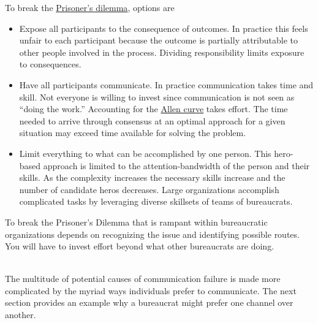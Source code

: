 To break the 
\href{https://en.wikipedia.org/wiki/Prisoner\%27s\_dilemma}{Prisoner's dilemma}, 
options are 
\begin{itemize}
    \item Expose all participants to the consequence of outcomes. In practice this feels unfair to each participant because the outcome is partially attributable to other people involved in the process. Dividing responsibility limits exposure to consequences.
    \item Have all participants communicate. In practice communication takes time and skill. Not everyone is willing to invest since communication is not seen as ``doing the work.'' Accounting for the \href{https://en.wikipedia.org/wiki/Allen\_curve}{Allen curve}
    takes effort. The time needed to arrive through consensus at an optimal approach for a given situation may exceed time available for solving the problem.
    \item Limit everything to what can be accomplished by one person. This hero-based approach is limited to the attention-bandwidth of the person and their skills. As the complexity increases the necessary skills increase and the number of candidate heros decreases. Large organizations accomplish complicated tasks by leveraging diverse skillsets of teams of bureaucrats.
\end{itemize}
To break the Prisoner's Dilemma that is rampant within bureaucratic organizations depends on recognizing the issue and identifying possible routes. You will have to invest effort beyond what other bureaucrats are doing.



\ \\


The multitude of potential causes of communication failure is made more complicated by the myriad ways individuals prefer to communicate. The next section provides an example why a bureaucrat might prefer one channel over another. 
 
 